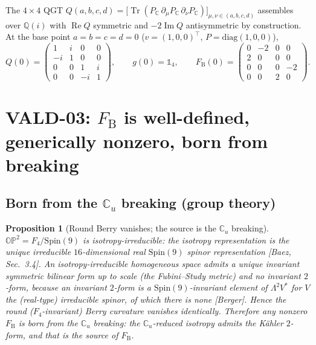 \documentclass[11pt]{article}
\newcommand{\Tr}{\operatorname{Tr}}
\renewcommand{\Re}{\operatorname{Re}}
\renewcommand{\Im}{\operatorname{Im}}
\newcommand{\Cu}{\mathbb{C}_u}
\newcommand{\OP}{\mathbb{OP}^2}
\newcommand{\Spin}{\mathrm{Spin}}
\newcommand{\FB}{F_{\mathrm{B}}}
\theoremstyle{plain}
\newtheorem{proposition}{Proposition}
\theoremstyle{definition}
\begin{document}
The $4\times4$ QGT $Q(a,b,c,d)=\big[\Tr(P_{\mathbb{C}}\,\partial_\mu P_{\mathbb{C}}\,
\partial_\nu P_{\mathbb{C}})\big]_{\mu,\nu\in(a,b,c,d)}$ assembles over $\mathbb{Q}(i)$ with
$\Re Q$ symmetric and $-2\Im Q$ antisymmetric by construction. At the base point
$a=b=c=d=0$ ($v=(1,0,0)^\top$, $P=\mathrm{diag}(1,0,0)$),
\begin{equation}
  Q(0)=\begin{pmatrix}
    1 & i & 0 & 0\\ -i & 1 & 0 & 0\\ 0 & 0 & 1 & i\\ 0 & 0 & -i & 1
  \end{pmatrix},
  \qquad
  g(0)=\mathbb{1}_4,
  \qquad
  \FB(0)=\begin{pmatrix}
    0 & -2 & 0 & 0\\ 2 & 0 & 0 & 0\\ 0 & 0 & 0 & -2\\ 0 & 0 & 2 & 0
  \end{pmatrix}.
  \label{eq:Qbase}
\end{equation}

\section{VALD-03: $\FB$ is well-defined, generically nonzero, born from breaking}
\label{sec:vald03}

\subsection{Born from the $\Cu$ breaking (group theory)}

\begin{proposition}[Round Berry vanishes; the source is the $\Cu$ breaking]
\label{prop:born}
$\OP=F_4/\Spin(9)$ is isotropy-irreducible: the isotropy representation is the unique
irreducible $16$-dimensional real $\Spin(9)$ spinor representation [Baez, Sec.~3.4].
An isotropy-irreducible homogeneous space admits a unique invariant symmetric
bilinear form up to scale (the Fubini--Study metric) and \emph{no} invariant
$2$-form, because an invariant $2$-form is a $\Spin(9)$-invariant element of
$\Lambda^2 V^*$ for $V$ the (real-type) irreducible spinor, of which there is none
[Berger]. Hence the round ($F_4$-invariant) Berry curvature vanishes identically.
Therefore any nonzero $\FB$ is \emph{born from the $\Cu$ breaking}: the
$\Cu$-reduced isotropy admits the K\"ahler $2$-form, and that is the source of
$\FB$.
\end{proposition}
\end{document}
